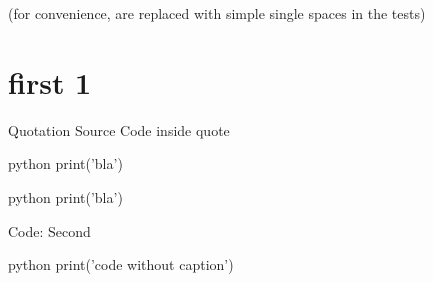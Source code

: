 (for convenience,   are replaced with simple single spaces in the tests)

\chapter{first 1}
\begin{Quotation}{Quotation Source}
Code inside quote

\begin{codeBlock}{python}
print('bla')
\end{codeBlock}
\end{Quotation}

\begin{codeBlock}{python}
print('bla')
\end{codeBlock}

Code: Second

\begin{codeBlock}{python}
print('code without caption')
\end{codeBlock}
